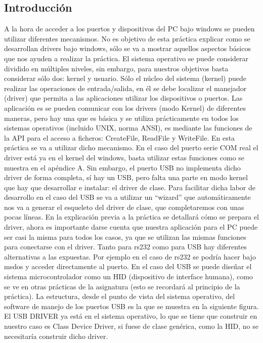\documentclass[a4paper, 11pt]{article}
\begin{document}
\subsection{Introducción}
A la hora de acceder a los puertos y dispositivos del PC bajo
windows se pueden utilizar diferentes mecanismos. No es objetivo de
esta práctica explicar como se desarrollan drivers bajo windows,
sólo se va a mostrar aquellos aspectos básicos que nos ayuden a
realizar la práctica.  El sistema operativo se puede considerar
dividido en múltiples niveles, sin embargo, para nuestros objetivos
basta considerar sólo dos: kernel y usuario. Sólo el núcleo del
sistema (kernel) puede realizar las operaciones de entrada/salida,
en él se debe localizar el manejador (driver) que permita a las
aplicaciones utilizar los dispositivos o puertos. Las aplicación es
se pueden comunicar con los drivers (modo Kernel) de diferentes
maneras, pero hay una que es básica y se utiliza prácticamente en
todos los sistemas operativos (incluido UNIX, norma ANSI), es
mediante las funciones de la API para el acceso a ficheros:
CreateFile, ReadFile y WriteFile. En esta práctica se va a utilizar
dicho mecanismo. En el caso del puerto serie COM real el driver
está ya en el kernel del windows, basta utilizar estas funciones
como se muestra en el apéndice A. Sin embargo, el puerto USB no
implementa dicho driver de forma completa, sí hay un USB, pero
falta una parte en modo kernel que hay que desarrollar e instalar:
el driver de clase. Para facilitar dicha labor de desarrollo en el
caso del USB se va a utilizar un ``wizard'' que automáticamente nos
va a generar el esqueleto del driver de clase, que completaremos
con unas pocas líneas.  En la explicación previa a la práctica se
detallará cómo se prepara el driver, ahora es importante darse
cuenta que nuestra aplicación para el PC puede ser casi la misma
para todos los casos, ya que se utilizan las mismas funciones para
conectarse con el driver.  Tanto para rs232 como para USB hay
diferentes alternativas a las expuestas. Por ejemplo en el caso de
rs232 se podría hacer bajo msdos y acceder directamente al puerto.
En el caso del USB se puede diseñar el sistema microcontrolador
como un HID (dispositivo de interface humana), como se ve en otras
prácticas de la asignatura (esto se recordará al principio de la
práctica).  La estructura, desde el punto de vista del sistema
operativo, del software de manejo de los puertos USB es la que se
muestra en la siguiente figura. El USB DRIVER ya está en el sistema
operativo, lo que se tiene que construir en nuestro caso es Class
Device Driver, si fuese de clase genérica, como la HID, no se
necesitaría construir dicho driver.
\end{document}
